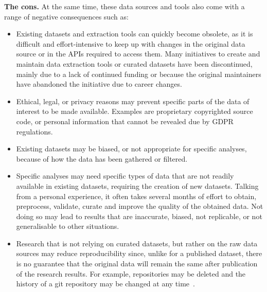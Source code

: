 \smallskip \textbf{The cons.}
At the same time, these data sources and tools also come with a range of negative consequences such as:
\begin{itemize}
\item Existing datasets and extraction tools can quickly become obsolete, as it is difficult and effort-intensive to keep up with changes in the original data source or in the APIs required to access them. Many initiatives to create and maintain data extraction tools or curated datasets have been discontinued, mainly due to a lack of continued  funding or because the original maintainers have abandoned the initiative due to career changes.
\item Ethical, legal, or privacy reasons may prevent specific parts of the data of interest to be made available. Examples are proprietary copyrighted source code, or personal information that cannot be revealed due by GDPR regulations.
\item Existing datasets may be biased, or not appropriate for specific analyses, because of how the data has been gathered or filtered. 
\item Specific analyses may need specific types of data that are not readily available in existing datasets,  requiring the creation of new datasets. Talking from a personal experience, it often takes several months of effort to obtain, preprocess, validate, curate and improve the quality of the obtained data. Not doing so may lead to results that are inaccurate, biased, not replicable, or not generalisable to other situations.
\item Research that is not relying on curated datasets, but rather on the raw data sources may reduce reproducibility since, unlike for a published dataset, there is no guarantee that the original data will remain the same after publication of the research results. For example, \github repositories may be deleted and the history of a git repository may be changed at any time~\cite{Bird2009,Kalliamvakou2014}.
\end{itemize}


